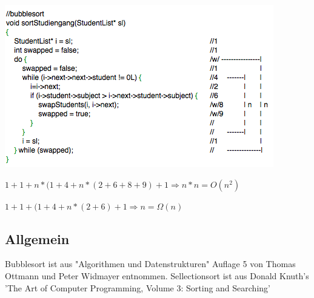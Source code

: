 \documentclass{article}
\begin{document}

\includegraphics{bubblesort}

$1+1+n*(1+4+n*(2+6+8+9)+1 \Rightarrow  n*n = O(n^2)$

$1+1+(1+4+n*(2+6)+1        \Rightarrow  n   = \Omega(n)$

\newpage
\subsection{Allgemein}
Bubblesort ist aus "Algorithmen und Datenstrukturen" Auflage 5 von Thomas Ottmann und Peter Widmayer entnommen. 
Sellectionsort ist aus Donald Knuth's 'The Art of Computer Programming, Volume 3: Sorting and Searching'
\end{document}
